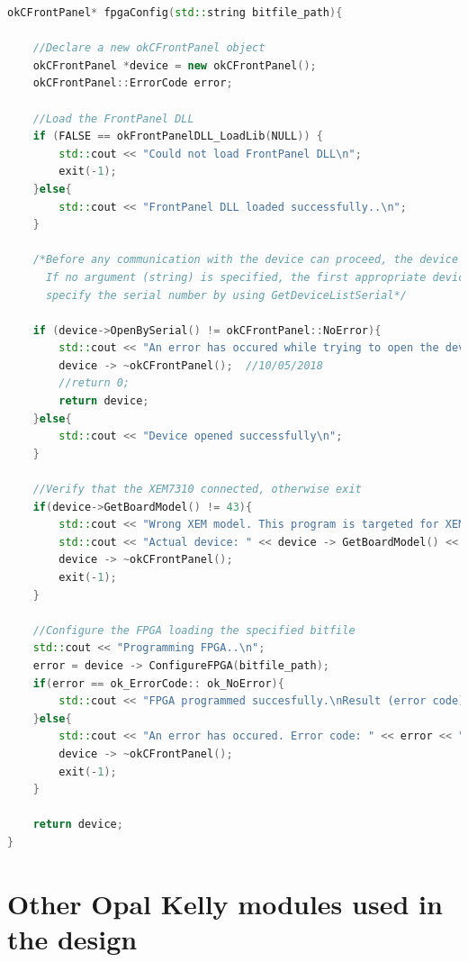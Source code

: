 \begin{lstlisting}[language={C++}, label={code:fpga-config}, caption={Function to Upload bitstream to FPGA (Made by my supervisor Alessandro Tontini)}]
okCFrontPanel* fpgaConfig(std::string bitfile_path){

	//Declare a new okCFrontPanel object
	okCFrontPanel *device = new okCFrontPanel();
	okCFrontPanel::ErrorCode error;

	//Load the FrontPanel DLL
	if (FALSE == okFrontPanelDLL_LoadLib(NULL)) {
		std::cout << "Could not load FrontPanel DLL\n";
		exit(-1);
	}else{
		std::cout << "FrontPanel DLL loaded successfully..\n";
	}
	
	/*Before any communication with the device can proceed, the device must be opened.
	  If no argument (string) is specified, the first appropriate device is opened, otherwise
	  specify the serial number by using GetDeviceListSerial*/
	
	if (device->OpenBySerial() != okCFrontPanel::NoError){
		std::cout << "An error has occured while trying to open the device. Error code is " << device->OpenBySerial() <<"\n";
		device -> ~okCFrontPanel();  //10/05/2018
		//return 0;
		return device;
	}else{
		std::cout << "Device opened successfully\n";
	}
		
	//Verify that the XEM7310 connected, otherwise exit
    if(device->GetBoardModel() != 43){
		std::cout << "Wrong XEM model. This program is targeted for XEM7310A75. ";
		std::cout << "Actual device: " << device -> GetBoardModel() << "\n";
    	device -> ~okCFrontPanel();
    	exit(-1);
	}
			
	//Configure the FPGA loading the specified bitfile
	std::cout << "Programming FPGA..\n";
	error = device -> ConfigureFPGA(bitfile_path);
	if(error == ok_ErrorCode:: ok_NoError){
		std::cout << "FPGA programmed succesfully.\nResult (error code): " << error << "\n";
	}else{
		std::cout << "An error has occured. Error code: " << error << "\n";
		device -> ~okCFrontPanel();
		exit(-1);
	}
		
	return device;
}
\end{lstlisting}



\section{Other Opal Kelly modules used in the design}


